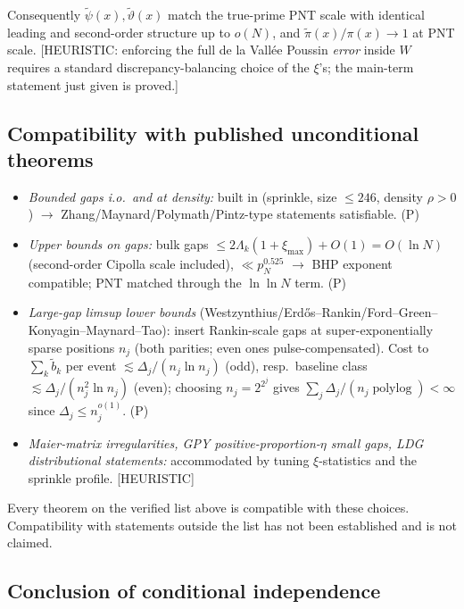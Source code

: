 \documentclass[11pt]{article}
\theoremstyle{definition}
\begin{document}
Consequently $\tilde\psi(x),\tilde\vartheta(x)$ match the true-prime PNT scale with identical leading and second-order structure up to $o(N)$, and $\tilde\pi(x)/\pi(x)\to1$ at PNT scale. [HEURISTIC: enforcing the full de la Vall\'ee Poussin \emph{error} inside $W$ requires a standard discrepancy-balancing choice of the $\xi$'s; the main-term statement just given is proved.]

\subsection{Compatibility with published unconditional theorems}

\begin{itemize}\itemsep2pt
\item \emph{Bounded gaps i.o.\ and at density:} built in (sprinkle, size $\le246$, density $\rho>0$) $\to$ Zhang/Maynard/Polymath/Pintz-type statements satisfiable. (P)
\item \emph{Upper bounds on gaps:} bulk gaps $\le2\Lambda_k(1+\xi_{\max})+O(1)=O(\ln N)$ (second-order Cipolla scale included), $\ll p_N^{0.525}$ $\to$ BHP exponent compatible; PNT matched through the $\ln\ln N$ term. (P)
\item \emph{Large-gap limsup lower bounds} (Westzynthius/Erd\H{o}s--Rankin/Ford--Green--Konyagin--Maynard--Tao): insert Rankin-scale gaps at super-exponentially sparse positions $n_j$ (both parities; even ones pulse-compensated). Cost to $\sum_k\tilde b_k$ per event $\lesssim\Delta_j/(n_j\ln n_j)$ (odd), resp.\ baseline class $\lesssim\Delta_j/(n_j^2\ln n_j)$ (even); choosing $n_j=2^{2^j}$ gives $\sum_j\Delta_j/(n_j\operatorname{polylog})<\infty$ since $\Delta_j\le n_j^{o(1)}$. (P)
\item \emph{Maier-matrix irregularities, GPY positive-proportion-$\eta$ small gaps, LDG distributional statements:} accommodated by tuning $\xi$-statistics and the sprinkle profile. [HEURISTIC]
\end{itemize}
Every theorem on the verified list above is compatible with these choices. Compatibility with statements outside the list has not been established and is not claimed.

\subsection{Conclusion of conditional independence}
\end{document}
